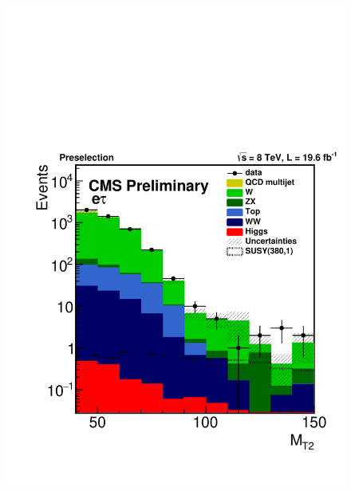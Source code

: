\begin{figure}[!Hhtb]
\centering
\includegraphics[angle=0,scale=0.375]{SelectionEleTau/MT2.pdf}

\end{figure}
